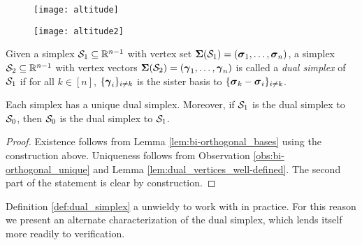 \begin{figure}
	\centering
	\begin{minipage}{0.45\textwidth}
		\centering
		\texttt{[image: altitude]}
	\end{minipage}
	\begin{minipage}{0.45\textwidth}
		\centering
		\texttt{[image: altitude2]}
	\end{minipage}
\end{figure}


\begin{definition}
\label{def:dual_simplex}
Given a simplex $\mathcal{S}_1\subseteq\mathbb{R}^{n-1}$ with vertex set $\boldsymbol{\Sigma}(\mathcal{S}_1)=(\vb*{\sigma}_1,\dots,\vb*{\sigma}_n)$, a simplex $\mathcal{S}_2\subseteq \mathbb{R}^{n-1}$ with vertex vectors $\boldsymbol{\Sigma}(\mathcal{S}_2)=(\vb*{\gamma}_1,\dots,\vb*{\gamma}_n)$ is called a \emph{dual simplex} of $\mathcal{S}_1$ if for all $k\in[n]$, $\{\vb*{\gamma}_i\}_{i\neq k}$ is the sister basis to $\{\vb*{\sigma}_k-\vb*{\sigma}_i\}_{i\neq k}$. 
\end{definition}

\begin{theorem}
	\label{thm:dual_simplex}
Each simplex has a unique dual simplex. Moreover, if $\mathcal{S}_1$ is the dual simplex to $\mathcal{S}_0$, then $\mathcal{S}_0$ is the dual simplex to $\mathcal{S}_1$. 
\end{theorem}
\begin{proof}
Existence follows from Lemma \ref{lem:bi-orthogonal_bases} using the construction above. Uniqueness follows from Observation \ref{obs:bi-orthogonal_unique} and Lemma \ref{lem:dual_vertices_well-defined}. The second part of the statement is clear by construction. 
\end{proof}

Definition \ref{def:dual_simplex} a unwieldy to work with in practice. For this reason we present an alternate characterization of the dual simplex, which lends itself more readily to verification. 

